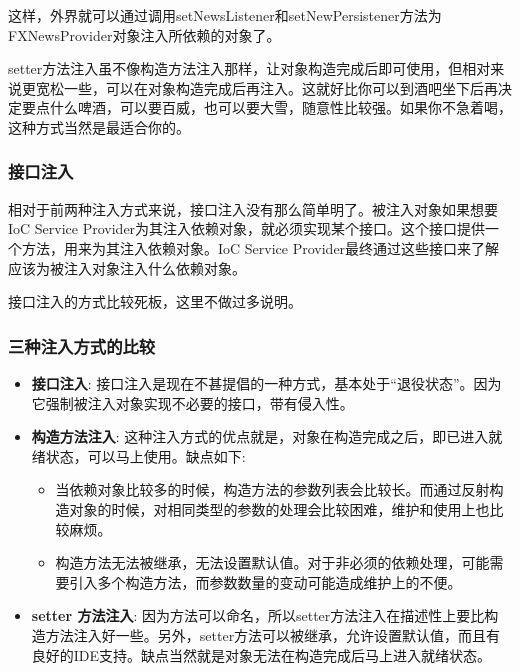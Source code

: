 这样，外界就可以通过调用setNewsListener和setNewPersistener方法为FXNewsProvider对象注入所依赖的对象了。

setter方法注入虽不像构造方法注入那样，让对象构造完成后即可使用，但相对来说更宽松一些，可以在对象构造完成后再注入。这就好比你可以到酒吧坐下后再决定要点什么啤酒，可以要百威，也可以要大雪，随意性比较强。如果你不急着喝，这种方式当然是最适合你的。

\subsubsection{接口注入}

相对于前两种注入方式来说，接口注入没有那么简单明了。被注入对象如果想要IoC  Service  Provider为其注入依赖对象，就必须实现某个接口。这个接口提供一个方法，用来为其注入依赖对象。IoC Service Provider最终通过这些接口来了解应该为被注入对象注入什么依赖对象。

接口注入的方式比较死板，这里不做过多说明。

\subsubsection{三种注入方式的比较}

\begin{itemize}
    \item \textbf{接口注入}: 接口注入是现在不甚提倡的一种方式，基本处于“退役状态”。因为它强制被注入对象实现不必要的接口，带有侵入性。
    \item \textbf{构造方法注入}: 这种注入方式的优点就是，对象在构造完成之后，即已进入就绪状态，可以马上使用。缺点如下: 
        \begin{itemize}
            \item 当依赖对象比较多的时候，构造方法的参数列表会比较长。而通过反射构造对象的时候，对相同类型的参数的处理会比较困难，维护和使用上也比较麻烦。
            \item 构造方法无法被继承，无法设置默认值。对于非必须的依赖处理，可能需要引入多个构造方法，而参数数量的变动可能造成维护上的不便。
        \end{itemize}
    \item \textbf{setter 方法注入}: 因为方法可以命名，所以setter方法注入在描述性上要比构造方法注入好一些。另外，setter方法可以被继承，允许设置默认值，而且有良好的IDE支持。缺点当然就是对象无法在构造完成后马上进入就绪状态。
\end{itemize}

\newpage